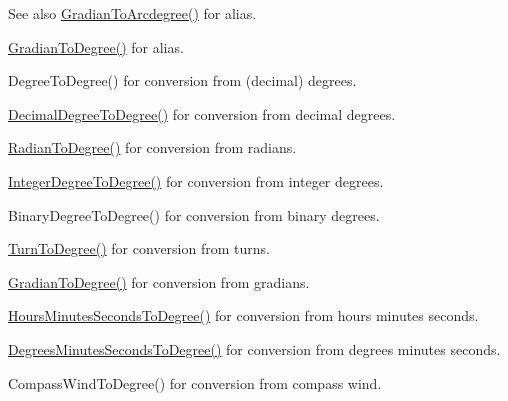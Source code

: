 \begin{DoxySeeAlso}{See also}
\mbox{\hyperlink{group___e_g_x_math-_angle_conversions-_gradian_gacd0b1797f2460944dcbc541a855ec21c}{Gradian\+To\+Arcdegree()}} for alias. 

\mbox{\hyperlink{group___e_g_x_math-_angle_conversions-_gradian_gaa284952274f16d225951cf5139d0ff4e}{Gradian\+To\+Degree()}} for alias. 

Degree\+To\+Degree() for conversion from (decimal) degrees. 

\mbox{\hyperlink{group___e_g_x_math-_angle_conversions-_decimal_degree_ga0aa7f2f5dbb00cf4ab303421c6e33ccf}{Decimal\+Degree\+To\+Degree()}} for conversion from decimal degrees. 

\mbox{\hyperlink{group___e_g_x_math-_angle_conversions-_radian_ga25bbce6cdc1c3621f2a158d320e3bc45}{Radian\+To\+Degree()}} for conversion from radians. 

\mbox{\hyperlink{group___e_g_x_math-_angle_conversions-_integer_degree_gaa9b63c6095fd7f8809fcfa2ba1e62235}{Integer\+Degree\+To\+Degree()}} for conversion from integer degrees. 

Binary\+Degree\+To\+Degree() for conversion from binary degrees. 

\mbox{\hyperlink{group___e_g_x_math-_angle_conversions-_turn_ga19eceb6db54a1cf17789639c2a869cb9}{Turn\+To\+Degree()}} for conversion from turns. 

\mbox{\hyperlink{group___e_g_x_math-_angle_conversions-_gradian_gaa284952274f16d225951cf5139d0ff4e}{Gradian\+To\+Degree()}} for conversion from gradians. 

\mbox{\hyperlink{group___e_g_x_math-_angle_conversions-_hours_minutes_seconds_ga4f66698550a0cf0fd326f25aba2c0d80}{Hours\+Minutes\+Seconds\+To\+Degree()}} for conversion from hours minutes seconds. 

\mbox{\hyperlink{group___e_g_x_math-_angle_conversions-_degrees_minutes_seconds_gae59bfb37c0751e60e315f8a1ed3dc0cf}{Degrees\+Minutes\+Seconds\+To\+Degree()}} for conversion from degrees minutes seconds. 

Compass\+Wind\+To\+Degree() for conversion from compass wind. 
\end{DoxySeeAlso}
\mbox{\label{group___e_g_x_math-_angle_conversions-_gradian_ga5c81967ddb8f677634d161713174e419}} 
